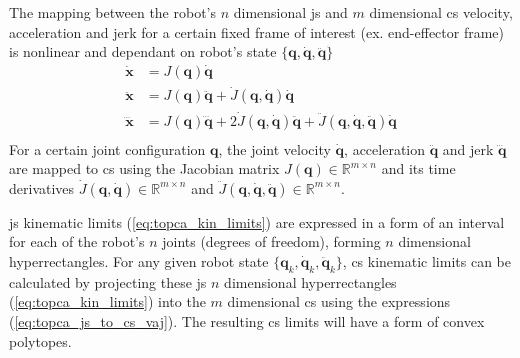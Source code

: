 The mapping between the robot's $n$ dimensional \gls{js} and $m$ dimensional \gls{cs} velocity, acceleration and jerk for a certain fixed frame of interest (ex. end-effector frame) is nonlinear and dependant on robot's state $\{\bm{q},\dot{\bm{q}},\ddot{\bm{q}}\}$ 
\begin{equation}
\begin{split}
\dot{\bm{x}}&= J(\bm{q})\dot{\bm{q}}\\
\ddot{\bm{x}}&= J(\bm{q})\ddot{\bm{q}} + \dot{J}(\bm{q},\dot{\bm{q}})\dot{\bm{q}}\\
\dddot{\bm{x}}&= J(\bm{q})\dddot{\bm{q}} + 2\dot{J}(\bm{q},\dot{\bm{q}})\ddot{\bm{q}} + \ddot{J}(\bm{q},\dot{\bm{q}},\ddot{\bm{q}})\dot{\bm{q}}\\
 \end{split} \label{eq:topca_js_to_cs_vaj}
\end{equation}
For a certain joint configuration $\bm{q}$, the joint velocity $\dot{\bm{q}}$, acceleration $\ddot{\bm{q}}$ and jerk $\dddot{\bm{q}}$ are mapped to \gls{cs} using the Jacobian matrix $J(\bm{q})\in\mathbb{R}^{m\times n}$ and its time derivatives $\dot{J}(\bm{q},\dot{\bm{q}})\in\mathbb{R}^{m\times n}$ and  $\ddot{J}(\bm{q},\dot{\bm{q}},\ddot{\bm{q}})\in\mathbb{R}^{m\times n}$. 


\gls{js} kinematic limits (\ref{eq:topca_kin_limits}) are expressed in a form of an interval for each of the robot's $n$ joints (degrees of freedom), forming $n$ dimensional hyperrectangles. For any given robot state $\{\bm{q}_k,\dot{\bm{q}}_k,\ddot{\bm{q}}_k\}$, \gls{cs} kinematic limits can be calculated by projecting these \gls{js} $n$ dimensional hyperrectangles (\ref{eq:topca_kin_limits}) into the $m$ dimensional \gls{cs} using the expressions (\ref{eq:topca_js_to_cs_vaj}). The resulting \gls{cs} limits will have a form of convex polytopes. 

